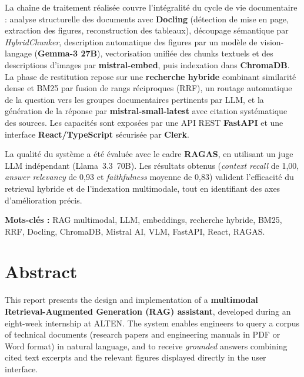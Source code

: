 La chaîne de traitement réalisée couvre l'intégralité du cycle de vie documentaire :
analyse structurelle des documents avec \textbf{Docling} (détection de mise en page,
extraction des figures, reconstruction des tableaux), découpage sémantique par
\emph{HybridChunker}, description automatique des figures par un modèle de vision-langage
(\textbf{Gemma-3 27B}), vectorisation unifiée des chunks textuels et des descriptions
d'images par \textbf{mistral-embed}, puis indexation dans \textbf{ChromaDB}. La phase de
restitution repose sur une \textbf{recherche hybride} combinant similarité dense et BM25 par
fusion de rangs réciproques (RRF), un routage automatique de la question vers les groupes
documentaires pertinents par LLM, et la génération de la réponse par
\textbf{mistral-small-latest} avec citation systématique des sources. Les capacités sont
exposées par une API REST \textbf{FastAPI} et une interface \textbf{React/TypeScript}
sécurisée par \textbf{Clerk}.

La qualité du système a été évaluée avec le cadre \textbf{RAGAS}, en utilisant un juge LLM
indépendant (Llama~3.3~70B). Les résultats obtenus (\emph{context recall} de 1{,}00,
\emph{answer relevancy} de 0{,}93 et \emph{faithfulness} moyenne de 0{,}83) valident
l'efficacité du retrieval hybride et de l'indexation multimodale, tout en identifiant des
axes d'amélioration précis.

\vspace{3mm}
\noindent\textbf{Mots-clés :} RAG multimodal, LLM, embeddings, recherche hybride, BM25,
RRF, Docling, ChromaDB, Mistral AI, VLM, FastAPI, React, RAGAS.

\cleardoublepage
\chapter*{Abstract}

This report presents the design and implementation of a \textbf{multimodal
Retrieval-Augmented Generation (RAG) assistant}, developed during an eight-week internship
at ALTEN. The system enables engineers to query a corpus of technical documents (research
papers and engineering manuals in PDF or Word format) in natural language, and to receive
\emph{grounded} answers combining cited text excerpts and the relevant figures displayed
directly in the user interface.

